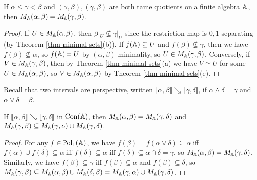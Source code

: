 \begin{appendices}
\begin{comment}
If $f(C) \subseteq N$ for some $f \in \Pol_1(\bA|_C)$ such that $f(C)$ is not contained in any congruence class of $\alpha$, then by Corollary \ref{cor-trace-iso} we have $f : N \simeq f(N)$, so in fact $f(N) = N$. This proves that $N$ is an $(\alpha|_C,1_C)$-minimal set of $\bA|_C$.

Now suppose that $(x,y) \in C^2 \setminus \alpha|_C$. Then by Theorem \ref{thm-minimal-sets}
\end{proof}
\end{comment}

\begin{prop} If $\alpha \le \gamma < \beta$ and $(\alpha,\beta), (\gamma,\beta)$ are both tame quotients on a finite algebra $\mathbb{A}$, then $M_{\mathbb{A}}(\alpha,\beta) = M_{\mathbb{A}}(\gamma,\beta)$.
\end{prop}
\begin{proof} If $U \in M_{\mathbb{A}}(\alpha,\beta)$, then $\beta|_U \not\subseteq \gamma|_U$ since the restriction map is $0,1$-separating (by Theorem \ref{thm-minimal-sets}(b)). If $f(\mathbb{A}) \subseteq U$ and $f(\beta) \not\subseteq \gamma$, then we have $f(\beta) \not\subseteq \alpha$, so $f(\mathbb{A}) = U$ by $(\alpha,\beta)$-minimality, so $U \in M_{\mathbb{A}}(\gamma,\beta)$. Conversely, if $V \in M_{\mathbb{A}}(\gamma,\beta)$, then by Theorem \ref{thm-minimal-sets}(a) we have $V \simeq U$ for some $U \in M_{\mathbb{A}}(\alpha,\beta)$, so $V \in M_{\mathbb{A}}(\alpha,\beta)$ by Theorem \ref{thm-minimal-sets}(e).
\end{proof}

Recall that two intervals are perspective, written $\llbracket \alpha, \beta \rrbracket \searrow \llbracket \gamma, \delta \rrbracket$, if $\alpha \wedge \delta = \gamma$ and $\alpha \vee \delta = \beta$.

\begin{prop}\label{prop-minimal-sets-perspective} If $\llbracket \alpha, \beta \rrbracket \searrow \llbracket \gamma, \delta \rrbracket$ in $\operatorname{Con}(\mathbb{A})$, then $M_{\mathbb{A}}(\alpha,\beta) = M_{\mathbb{A}}(\gamma,\delta)$ and $M_{\mathbb{A}}(\gamma,\beta) \subseteq M_{\mathbb{A}}(\gamma,\alpha) \cup M_{\mathbb{A}}(\gamma, \delta)$.
\end{prop}
\begin{proof} For any $f \in \operatorname{Pol}_1(\mathbb{A})$, we have $f(\beta) = f(\alpha \vee \delta) \subseteq \alpha$ iff $f(\alpha) \cup f(\delta) \subseteq \alpha$ iff $f(\delta) \subseteq \alpha$ iff $f(\delta) \subseteq \alpha \cap \delta = \gamma$, so $M_{\mathbb{A}}(\alpha,\beta) = M_{\mathbb{A}}(\gamma,\delta)$. Similarly, we have $f(\beta) \subseteq \gamma$ iff $f(\beta) \subseteq \alpha$ and $f(\beta) \subseteq \delta$, so $M_{\mathbb{A}}(\gamma,\beta) \subseteq M_{\mathbb{A}}(\alpha,\beta) \cup M_{\mathbb{A}}(\delta,\beta) = M_{\mathbb{A}}(\gamma,\alpha) \cup M_{\mathbb{A}}(\gamma, \delta)$.
\end{proof}


\end{appendices}
